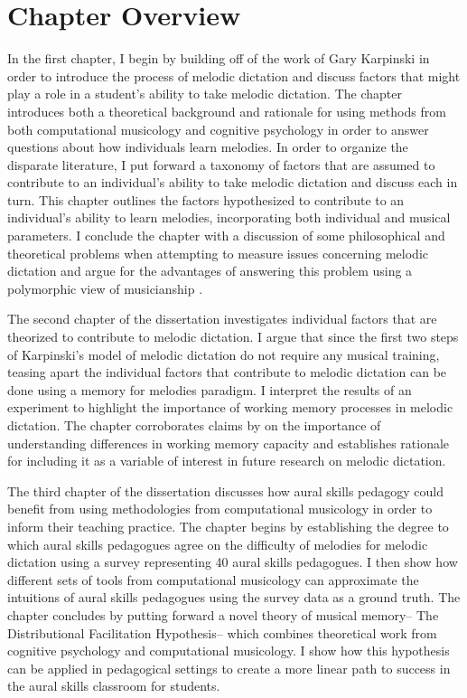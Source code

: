 \documentclass[]{book}
\begin{document}
\hypertarget{chapter-overview}{%
\section{Chapter Overview}\label{chapter-overview}}

In the first chapter, I begin by building off of the work of Gary Karpinski \citep{karpinskiAuralSkillsAcquisition2000, karpinskiModelMusicPerception1990} in order to introduce the process of melodic dictation and discuss factors that might play a role in a student's ability to take melodic dictation.
The chapter introduces both a theoretical background and rationale for using methods from both computational musicology and cognitive psychology in order to answer questions about how individuals learn melodies.
In order to organize the disparate literature, I put forward a taxonomy of factors that are assumed to contribute to an individual's ability to take melodic dictation and discuss each in turn.
This chapter outlines the factors hypothesized to contribute to an individual's ability to learn melodies, incorporating both individual and musical parameters.
I conclude the chapter with a discussion of some philosophical and theoretical problems when attempting to measure issues concerning melodic dictation and argue for the advantages of answering this problem using a polymorphic view of musicianship \citep{levitinWhatDoesIt2012, peretzNatureMusicBiological2006, bakerExaminingMusicalSophistication2018}.

The second chapter of the dissertation investigates individual factors that are theorized to contribute to melodic dictation.
I argue that since the first two steps of Karpinski's model of melodic dictation do not require any musical training, teasing apart the individual factors that contribute to melodic dictation can be done using a memory for melodies paradigm.
I interpret the results of an experiment to highlight the importance of working memory processes in melodic dictation.
The chapter corroborates claims by \citet{berzWorkingMemoryMusic1995} on the importance of understanding differences in working memory capacity and establishes rationale for including it as a variable of interest in future research on melodic dictation.

The third chapter of the dissertation discusses how aural skills pedagogy could benefit from using methodologies from computational musicology in order to inform their teaching practice.
The chapter begins by establishing the degree to which aural skills pedagogues agree on the difficulty of melodies for melodic dictation using a survey representing 40 aural skills pedagogues.
I then show how different sets of tools from computational musicology can approximate the intuitions of aural skills pedagogues using the survey data as a ground truth.
The chapter concludes by putting forward a novel theory of musical memory-- The Distributional Facilitation Hypothesis-- which combines theoretical work from cognitive psychology and computational musicology.
I show how this hypothesis can be applied in pedagogical settings to create a more linear path to success in the aural skills classroom for students.
\end{document}

